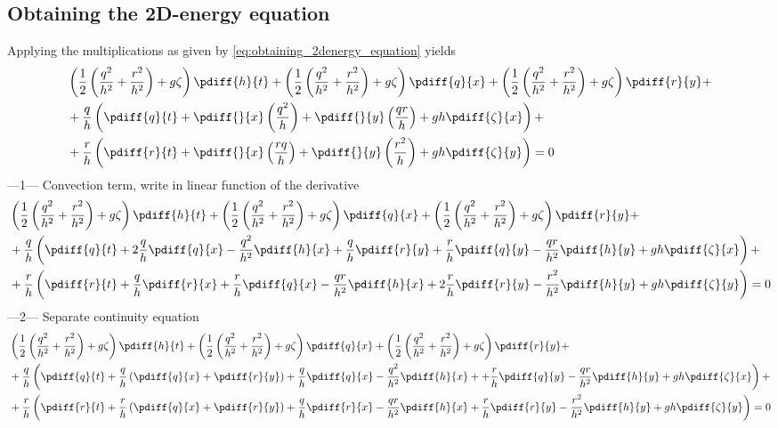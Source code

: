 \subsection{Obtaining the 2D-energy equation}\label{sec:obtaining_2denergy_equation}
Applying the multiplications as given by \autoref{eq:obtaining_2denergy_equation} yields
\begin{align}
    & \left( \half \left( \frac{q^2}{h^2} + \frac{r^2}{h^2} \right)+ g\zeta  \right) \pdiff{h}{t}
    + \left( \half \left( \frac{q^2}{h^2} + \frac{r^2}{h^2} \right)+ g\zeta  \right) \pdiff{q}{x}
    + \left( \half \left( \frac{q^2}{h^2} + \frac{r^2}{h^2} \right)+ g\zeta  \right) \pdiff{r}{y} +
    \\*
    &+ \frac{q}{h} \left(
    \pdiff{q}{t}
    + \pdiff{}{x} \left( \frac{q^2}{h} \right) + \pdiff{}{y} \left( \frac{qr}{h} \right)
    + g h \pdiff{\zeta}{x} \right) +
    \\*
    &+ \frac{r}{h} \left(
    \pdiff{r}{t} +  \pdiff{}{x} \left( \frac{rq}{h} \right) + \pdiff{}{y} \left( \frac{r^2}{h} \right)
    + g h \pdiff{\zeta}{y} \right) = 0
\end{align}
---1--- Convection term, write in linear function of the derivative
\begin{align}
    & \left( \half \left( \frac{q^2}{h^2} + \frac{r^2}{h^2} \right)+ g\zeta  \right) \pdiff{h}{t}
    + \left( \half \left( \frac{q^2}{h^2} + \frac{r^2}{h^2} \right)+ g\zeta  \right) \pdiff{q}{x}
    + \left( \half \left( \frac{q^2}{h^2} + \frac{r^2}{h^2} \right)+ g\zeta  \right) \pdiff{r}{y} +
    \\*
    &+ \frac{q}{h} \left(
    \pdiff{q}{t}
    +  2 \frac{q}{h}\pdiff{q}{x} - \frac{q^2}{h^2}\pdiff{h}{x} + \frac{q}{h}\pdiff{r}{y}+ \frac{r}{h}\pdiff{q}{y} - \frac{qr}{h^2}\pdiff{h}{y}
    + g h \pdiff{\zeta}{x} \right) +
    \\*
    &+ \frac{r}{h} \left(
    \pdiff{r}{t}
    +  \frac{q}{h}\pdiff{r}{x}+ \frac{r}{h}\pdiff{q}{x} - \frac{qr}{h^2}\pdiff{h}{x}
    + 2 \frac{r}{h}\pdiff{r}{y} - \frac{r^2}{h^2}\pdiff{h}{y}
    + g h \pdiff{\zeta}{y} \right) = 0
\end{align}
---2--- Separate continuity equation
\begin{align}
    & \left( \half \left( \frac{q^2}{h^2} + \frac{r^2}{h^2} \right)+ g\zeta  \right) \pdiff{h}{t}
    + \left( \half \left( \frac{q^2}{h^2} + \frac{r^2}{h^2} \right)+ g\zeta  \right) \pdiff{q}{x}
    + \left( \half \left( \frac{q^2}{h^2} + \frac{r^2}{h^2} \right)+ g\zeta  \right) \pdiff{r}{y} +
    \\*
    &+ \frac{q}{h} \left(
    \pdiff{q}{t}
    +  \frac{q}{h}\left( \pdiff{q}{x} + \pdiff{r}{y}   \right) +  \frac{q}{h}\pdiff{q}{x} - \frac{q^2}{h^2}\pdiff{h}{x} + + \frac{r}{h}\pdiff{q}{y} - \frac{qr}{h^2}\pdiff{h}{y}
    + g h \pdiff{\zeta}{x} \right) +
    \\*
    &+ \frac{r}{h} \left(
    \pdiff{r}{t}
    + \frac{r}{h} \left(\pdiff{q}{x} + \pdiff{r}{y} \right)
    + \frac{q}{h}\pdiff{r}{x}  - \frac{qr}{h^2}\pdiff{h}{x}
    +  \frac{r}{h}\pdiff{r}{y} - \frac{r^2}{h^2}\pdiff{h}{y}
    + g h \pdiff{\zeta}{y} \right) = 0
\end{align}
